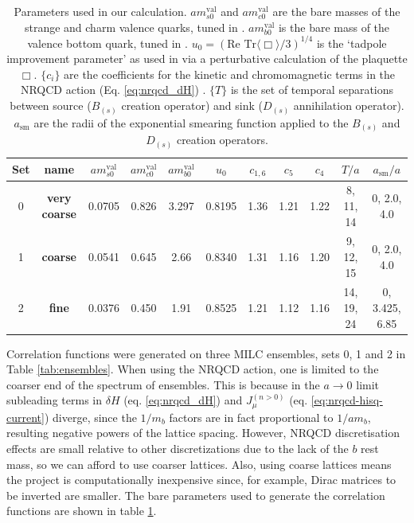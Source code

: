 \begin{table}[t!]
\hspace{-40pt}
 \begin{tabular}{c c c c c c c c c c c}
 \hline
 Set & name & $am^{\text{val}}_{s0}$ & $am^{\text{val}}_{c0}$ & $am^{\text{val}}_{b0}$ & $u_0$ & $c_{1,6}$ & $c_5$ & $c_4$ & $T/a$ & $a_{\text{sm}}/a$ \\ [0.5ex] 
 \hline
 0 & {\textbf{very coarse}} & 0.0705 & 0.826 & 3.297 & 0.8195 & 1.36 & 1.21 & 1.22 & 8, 11, 14 & 0, 2.0, 4.0 \\ [1ex]
 1 & {\textbf{coarse}} & 0.0541 & 0.645 & 2.66 & 0.8340 & 1.31 & 1.16 & 1.20 & 9, 12, 15 & 0, 2.0, 4.0 \\ [1ex]
 2 & {\textbf{fine}} & 0.0376 & 0.450 & 1.91 & 0.8525 &  1.21 & 1.12 & 1.16 & 14, 19, 24 & 0, 3.425, 6.85 \\ [1ex]
 \hline
\end{tabular}
 \caption{Parameters used in our calculation. $am^{\text{val}}_{s0}$ and $am^{\text{val}}_{c0}$ are the bare masses of the strange and charm valence quarks, tuned in \cite{PhysRevD.91.054508}. $am^{\text{val}}_{b0}$ is the bare mass of the valence bottom quark, tuned in \cite{Dowdall:2011wh}. $u_0 = (\text{Re Tr}\langle \Box \rangle/3)^{1/4}$ is the `tadpole improvement parameter' as used in \cite{Dowdall:2011wh} via a perturbative calculation of the plaquette $\Box$. $\{c_i\}$ are the coefficients for the kinetic and chromomagnetic terms in the NRQCD action (Eq. \eqref{eq:nrqcd_dH}) \cite{Hammant:2013sca}. $\{T\}$ is the set of temporal separations between source ($B_{(s)}$ creation operator) and sink ($D_{(s)}$ annihilation operator). $a_{\text{sm}}$ are the radii of the exponential smearing function applied to the $B_{(s)}$ and $D_{(s)}$ creation operators.
   \label{tab:quarkmasses}}
\end{table}

Correlation functions were generated on three MILC ensembles, sets 0, 1 and 2 in Table \ref{tab:ensembles}. When using the NRQCD action, one is limited to the coarser end of the spectrum of ensembles. This is because in the $a\to 0$ limit subleading terms in $\delta H$ (eq. \eqref{eq:nrqcd_dH}) and $J^{(n>0)}_{\mu}$ (eq. \eqref{eq:nrqcd-hisq-current}) diverge, since the $1/m_b$ factors are in fact proportional to $1/am_b$, resulting negative powers of the lattice spacing. However, NRQCD discretisation effects are small relative to other discretizations due to the lack of the $b$ rest mass, so we can afford to use coarser lattices. Also, using coarse lattices means the project is computationally inexpensive since, for example, Dirac matrices to be inverted are smaller. The bare parameters used to generate the correlation functions are shown in table \ref{tab:quarkmasses}.

